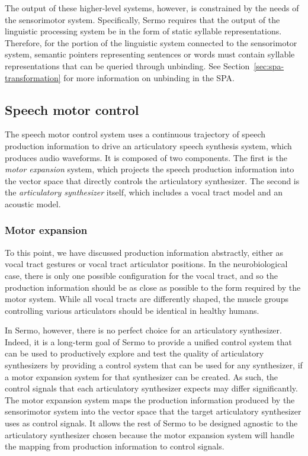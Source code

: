 The output of these higher-level systems,
however, is constrained by the needs
of the sensorimotor system.
Specifically, Sermo requires that
the output of the
linguistic processing system
be in the form of static syllable representations.
Therefore, for the portion
of the linguistic system connected
to the sensorimotor system,
semantic pointers representing
sentences or words must contain
syllable representations that can be
queried through unbinding.
See Section~\ref{sec:spa-transformation}
for more information
on unbinding in the SPA.

\subsection{Speech motor control}
\label{sec:model-motorcontrol}

The speech motor control system
uses a continuous trajectory
of speech production information
to drive an articulatory
speech synthesis system,
which produces audio waveforms.
It is composed of two components.
The first is the \textit{motor expansion} system,
which projects the speech production information
into the vector space that
directly controls the articulatory synthesizer.
The second is
the \textit{articulatory synthesizer} itself,
which includes a vocal tract model
and an acoustic model.

\subsubsection{Motor expansion}

To this point, we have discussed
production information abstractly,
either as vocal tract gestures
or vocal tract articulator positions.
In the neurobiological case,
there is only one possible
configuration for the vocal tract,
and so the production information
should be as close as possible to the
form required by the motor system.
While all vocal tracts are differently shaped,
the muscle groups controlling various articulators
should be identical in healthy humans.

In Sermo, however,
there is no perfect choice
for an articulatory synthesizer.
Indeed, it is a long-term goal of Sermo
to provide a unified control system
that can be used to productively
explore and test the quality
of articulatory synthesizers
by providing a control system
that can be used for any synthesizer,
if a motor expansion system
for that synthesizer can be created.
As such, the control signals
that each articulatory synthesizer
expects may differ significantly.
The motor expansion system
maps the production information
produced by the sensorimotor system
into the vector space that
the target articulatory synthesizer
uses as control signals.
It allows the rest of Sermo
to be designed agnostic
to the articulatory synthesizer chosen
because the motor expansion system
will handle the mapping
from production information
to control signals.

